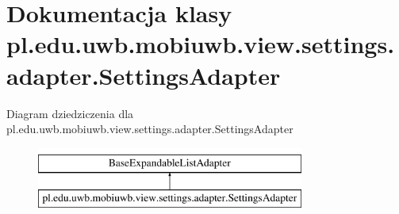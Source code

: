 \hypertarget{classpl_1_1edu_1_1uwb_1_1mobiuwb_1_1view_1_1settings_1_1adapter_1_1_settings_adapter}{}\section{Dokumentacja klasy pl.\+edu.\+uwb.\+mobiuwb.\+view.\+settings.\+adapter.\+Settings\+Adapter}
\label{classpl_1_1edu_1_1uwb_1_1mobiuwb_1_1view_1_1settings_1_1adapter_1_1_settings_adapter}
Diagram dziedziczenia dla pl.\+edu.\+uwb.\+mobiuwb.\+view.\+settings.\+adapter.\+Settings\+Adapter\begin{figure}[H]
\begin{center}
\leavevmode
\includegraphics[height=2.000000cm]{classpl_1_1edu_1_1uwb_1_1mobiuwb_1_1view_1_1settings_1_1adapter_1_1_settings_adapter}
\end{center}
\end{figure}
